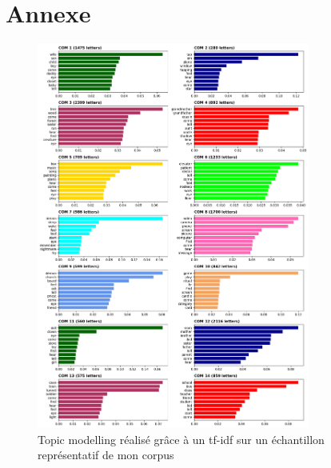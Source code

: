 \documentclass[onecolumn,12pt]{article}
\begin{document}
\section{Annexe}

\begin{figure}[htbp]
    \centering
    \includegraphics[width=0.8\textwidth]{tf_idf_topic_corpus.png}
    \caption{\small{Topic modelling réalisé grâce à un tf-idf sur un échantillon représentatif de mon corpus}}
\end{figure}
\end{document}
